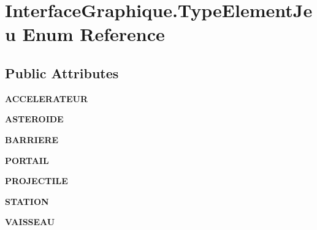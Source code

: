 \hypertarget{enum_interface_graphique_1_1_type_element_jeu}{\section{Interface\-Graphique.\-Type\-Element\-Jeu Enum Reference}
\label{enum_interface_graphique_1_1_type_element_jeu}
}
\subsection*{Public Attributes}
\begin{DoxyCompactItemize}
\item 
\hypertarget{enum_interface_graphique_1_1_type_element_jeu_ade1ba2cde4e5c43efd53d638202db4d9}{{\bfseries A\-C\-C\-E\-L\-E\-R\-A\-T\-E\-U\-R}}\label{enum_interface_graphique_1_1_type_element_jeu_ade1ba2cde4e5c43efd53d638202db4d9}

\item 
\hypertarget{enum_interface_graphique_1_1_type_element_jeu_aa17c2d1946fa2d2b120dd7c747272901}{{\bfseries A\-S\-T\-E\-R\-O\-I\-D\-E}}\label{enum_interface_graphique_1_1_type_element_jeu_aa17c2d1946fa2d2b120dd7c747272901}

\item 
\hypertarget{enum_interface_graphique_1_1_type_element_jeu_af0c6f389018de0a1cbe36ea89f310fb5}{{\bfseries B\-A\-R\-R\-I\-E\-R\-E}}\label{enum_interface_graphique_1_1_type_element_jeu_af0c6f389018de0a1cbe36ea89f310fb5}

\item 
\hypertarget{enum_interface_graphique_1_1_type_element_jeu_abc27ef9d06672ae972b59088ea6c3cdb}{{\bfseries P\-O\-R\-T\-A\-I\-L}}\label{enum_interface_graphique_1_1_type_element_jeu_abc27ef9d06672ae972b59088ea6c3cdb}

\item 
\hypertarget{enum_interface_graphique_1_1_type_element_jeu_a9baebf838211e1b8f240a808fb49bdf8}{{\bfseries P\-R\-O\-J\-E\-C\-T\-I\-L\-E}}\label{enum_interface_graphique_1_1_type_element_jeu_a9baebf838211e1b8f240a808fb49bdf8}

\item 
\hypertarget{enum_interface_graphique_1_1_type_element_jeu_a90e307eb0c1e971ae0c365d6b5592b5c}{{\bfseries S\-T\-A\-T\-I\-O\-N}}\label{enum_interface_graphique_1_1_type_element_jeu_a90e307eb0c1e971ae0c365d6b5592b5c}

\item 
\hypertarget{enum_interface_graphique_1_1_type_element_jeu_aed5814929c9a9c1190099091bd0c88ec}{{\bfseries V\-A\-I\-S\-S\-E\-A\-U}}\label{enum_interface_graphique_1_1_type_element_jeu_aed5814929c9a9c1190099091bd0c88ec}


\end{DoxyCompactItemize}
